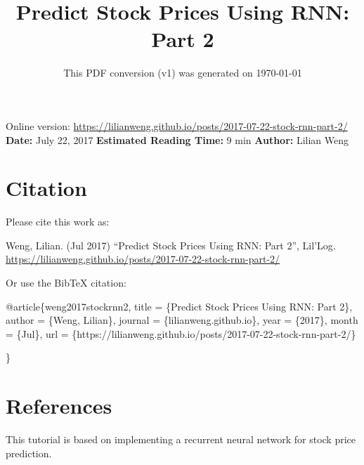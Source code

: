 \documentclass[12pt]{article}
\title{Predict Stock Prices Using RNN: Part 2}
\date{This PDF conversion (v1) was generated on \today\footnotemark}
\begin{document}
\maketitle
\begin{center}
    Online version: \url{https://lilianweng.github.io/posts/2017-07-22-stock-rnn-part-2/} \\
    \textbf{Date:} July 22, 2017 \quad
    \textbf{Estimated Reading Time:} 9 min \quad
    \textbf{Author:} Lilian Weng
\end{center}




\newpage
\tableofcontents
\newpage
\vspace{1em}



\section{Citation}
Please cite this work as:

\begin{tcolorbox}[colback=black!5!white, colframe=black!80!white, boxrule=0.5pt, arc=2mm, left=1mm, right=1mm, top=1mm, bottom=1mm]
  Weng, Lilian. (Jul 2017) ``Predict Stock Prices Using RNN: Part 2'', Lil'Log. \url{https://lilianweng.github.io/posts/2017-07-22-stock-rnn-part-2/}
  \end{tcolorbox}

Or use the BibTeX citation:

\begin{tcolorbox}[
    colback=black!5!white,
    colframe=black!80!white,
    boxrule=0.5pt,
    arc=2mm,
    left=1mm,
    right=1mm,
    top=1mm,
    bottom=1mm,
    listing only,
    listing options={
      basicstyle=\ttfamily\footnotesize,
      breaklines=true,
      literate={\{}{{\char`\{}}1 {\}}{{\char`\}}}1
    }
  ]
  @article\{weng2017stockrnn2,
    title   = \{Predict Stock Prices Using RNN: Part 2\},
    author  = \{Weng, Lilian\},
    journal = \{lilianweng.github.io\},
    year    = \{2017\},
    month   = \{Jul\},
    url     = \{https://lilianweng.github.io/posts/2017-07-22-stock-rnn-part-2/\}

  \}
  \end{tcolorbox}

\newpage
\section{References}

This tutorial is based on implementing a recurrent neural network for stock price prediction.
\end{document}
